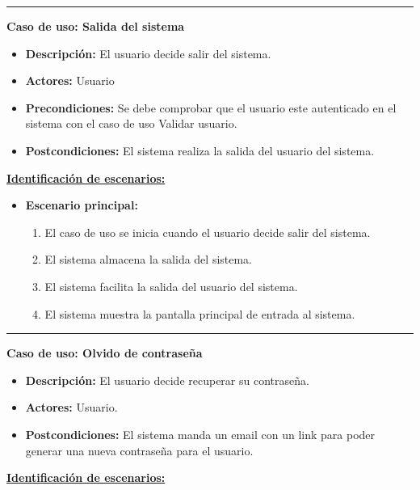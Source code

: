 \smallskip
\hrule height 1pt
\smallskip
\textbf{Caso de uso: Salida del sistema}
\begin{itemize}\renewcommand{\labelitemi}{$\cdot$}
 \item \textbf{Descripción:} El usuario decide salir del sistema.
  \item \textbf{Actores:} Usuario
  \item \textbf{Precondiciones:} Se debe comprobar que el usuario este autenticado en el sistema con el caso de uso Validar usuario.
  \item \textbf{Postcondiciones:} El sistema realiza la salida del usuario del sistema.
\end{itemize}
\underline{\textbf{Identificación de escenarios:}}
\begin{itemize}\renewcommand{\labelitemi}{$\circ$}
 \item \textbf{Escenario principal:}
         \begin{enumerate}
          \item El caso de uso se inicia cuando el usuario decide salir del sistema.
	 \item El sistema almacena la salida del sistema.
          \item El sistema facilita la salida del usuario del sistema.
	  \item El sistema muestra la pantalla principal de entrada al sistema.
         \end{enumerate}
\end{itemize}
\smallskip
\hrule height 1pt
\smallskip
\textbf{Caso de uso: Olvido de contraseña}
\begin{itemize}\renewcommand{\labelitemi}{$\cdot$}
 \item \textbf{Descripción:} El usuario decide recuperar su contraseña.
  \item \textbf{Actores:} Usuario.
  \item \textbf{Postcondiciones:} El sistema manda un email con un link para poder generar una nueva contraseña para el usuario.
\end{itemize}
\underline{\textbf{Identificación de escenarios:}}

